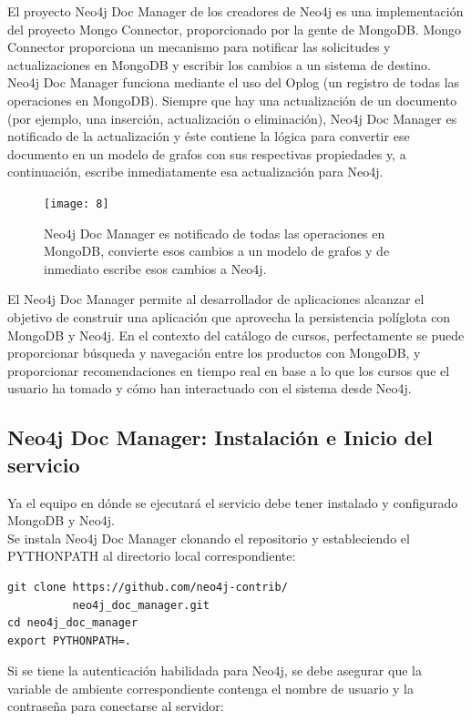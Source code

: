 \documentclass[conference]{IEEEtran}
\begin{document}
El proyecto Neo4j Doc Manager de los creadores de Neo4j es una implementaci\'on del proyecto Mongo Connector, proporcionado por la gente de MongoDB. Mongo Connector proporciona un mecanismo para notificar las solicitudes y actualizaciones en MongoDB y escribir los cambios a un sistema de destino. Neo4j Doc Manager funciona mediante el uso del Oplog (un registro de todas las operaciones en MongoDB). Siempre que hay una actualizaci\'on de un documento (por ejemplo, una inserci\'on, actualizaci\'on o eliminaci\'on), Neo4j Doc Manager es notificado de la actualizaci\'on y \'este contiene la l\'ogica para convertir ese documento en un modelo de grafos con sus respectivas propiedades y, a continuaci\'on, escribe inmediatamente esa actualizaci\'on para Neo4j.

\begin{figure}[!h]
\centering
\texttt{[image: 8]}
\caption{Neo4j Doc Manager es notificado de todas las operaciones en MongoDB, convierte esos cambios a un modelo de grafos  y de inmediato escribe esos cambios a Neo4j.}
\label{fig8}
\end{figure}

El Neo4j Doc Manager permite al desarrollador de aplicaciones alcanzar el objetivo de construir una aplicaci\'on que aprovecha la persistencia pol\'iglota con MongoDB y Neo4j. En el contexto del cat\'alogo de cursos, perfectamente se puede proporcionar b\'usqueda y navegaci\'on entre los productos con MongoDB, y proporcionar recomendaciones en tiempo real en base a lo que los cursos que el usuario ha tomado y c\'omo han interactuado con el sistema desde Neo4j.

\subsection*{Neo4j Doc Manager: Instalaci\'on e Inicio del servicio}

Ya el equipo en d\'onde se ejecutar\'a el servicio debe tener instalado y configurado MongoDB y Neo4j.\\
Se instala Neo4j Doc Manager clonando el repositorio y estableciendo el PYTHONPATH al directorio local correspondiente:

\begin{lstlisting}
git clone https://github.com/neo4j-contrib/
          neo4j_doc_manager.git
cd neo4j_doc_manager
export PYTHONPATH=.
\end{lstlisting}

Si se tiene la autenticaci\'on habilidada para Neo4j, se debe asegurar que la variable de ambiente  correspondiente contenga el nombre de usuario y la contraseña para conectarse al servidor:
\end{document}
